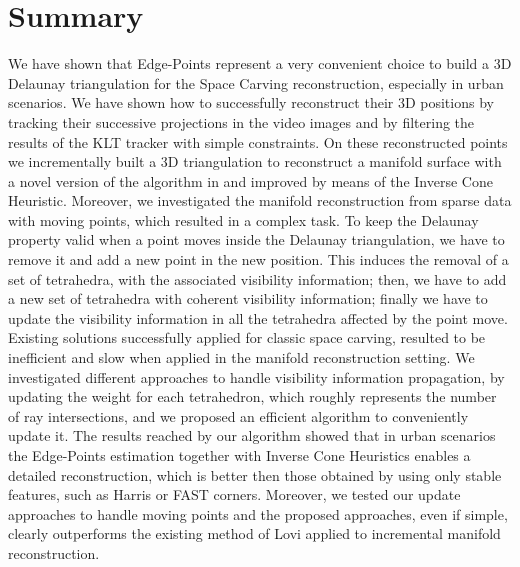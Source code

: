 \section{Summary}
\label{sec:conclusion}
We have shown that Edge-Points represent a very convenient choice to build a 3D Delaunay triangulation for the Space Carving reconstruction, especially in urban scenarios. We have shown how to successfully reconstruct their 3D positions by tracking their successive projections in the video images and by filtering the results of the KLT tracker with simple constraints.
On these reconstructed points we incrementally built a 3D triangulation to reconstruct a manifold surface with a novel version of the algorithm in \cite{litvinov_lhuillier_13}
and \cite{litvinov_Lhiuller14} improved by means of the Inverse Cone Heuristic. 
 Moreover, we investigated the manifold reconstruction from sparse data with moving points, which resulted in a complex task. To keep the Delaunay property
valid when a point moves inside the Delaunay triangulation, we have to remove it and add a new point in the new position. This induces the removal of a set of tetrahedra, with the associated visibility information; then, we have to add a new set of tetrahedra with coherent visibility information; finally we have to update the visibility information in all the tetrahedra affected by the point move. 
Existing solutions successfully applied for classic space carving, resulted to be inefficient and slow when applied in the manifold reconstruction setting. We investigated different approaches to handle visibility information propagation, by updating the weight for each tetrahedron, which roughly represents the number of ray intersections, and we proposed an efficient algorithm to conveniently update it.
The results reached by our algorithm showed that in urban scenarios the Edge-Points estimation together with Inverse Cone Heuristics enables a detailed reconstruction, which is better then those obtained by using only stable features, such as Harris or FAST corners. Moreover, we tested our update approaches to handle moving points and the proposed approaches, even if simple, clearly outperforms the existing method of Lovi \etal \cite{lovi_et_al_11}
applied to incremental manifold reconstruction.



